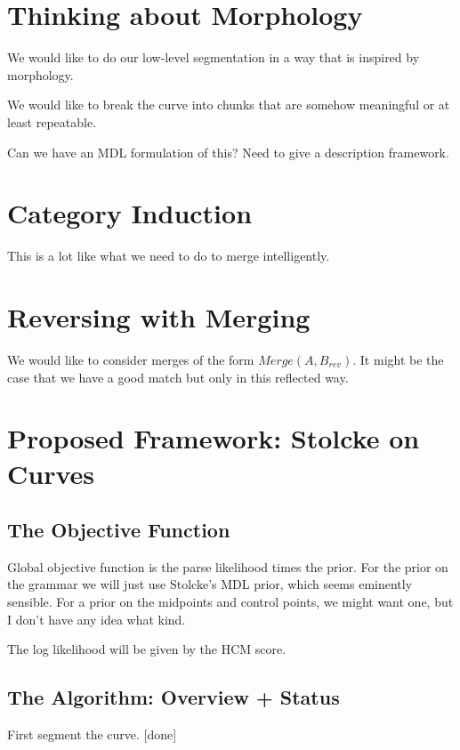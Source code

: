 \documentclass{article}
\begin{document}
\section{Thinking about Morphology}

We would like to do our low-level segmentation in a way that is
inspired by morphology.

We would like to break the curve into chunks that are somehow
meaningful or at least repeatable.

Can we have an MDL formulation of this? Need to give a description
framework.

\section{Category Induction}

This is a lot like what we need to do to merge intelligently.

\section{Reversing with Merging}

We would like to consider merges of the form $Merge(A,B_{rev})$.  It
might be the case that we have a good match but only in this reflected
way.

\section{Proposed Framework: Stolcke on Curves}

\subsection{The Objective Function}

Global objective function is the parse likelihood times the prior. For
the prior on the grammar we will just use Stolcke's MDL prior, which
seems eminently sensible. For a prior on the midpoints and control
points, we might want one, but I don't have any idea what kind.

The log likelihood will be given by the HCM score.

\subsection{The Algorithm: Overview + Status}

\benum
\item First segment the curve. [done]
\end{document}
